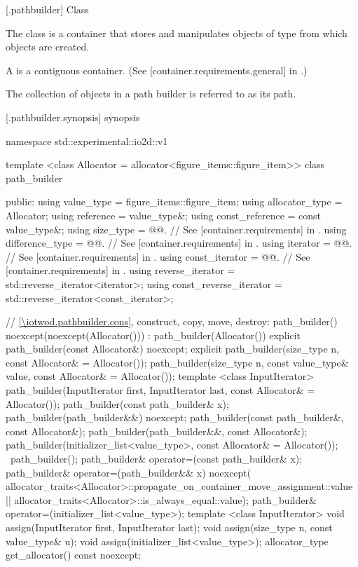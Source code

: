  [\iotwod.pathbuilder] {Class }

\pnum
{}%
The class  is a container that stores and manipulates objects of type  from which  objects are created.

\pnum
A  is a contiguous container. (See [container.requirements.general] in \cppseventeen.)

\pnum
The collection of  objects in a path builder is referred to as its path.

 [\iotwod.pathbuilder.synopsis] { synopsis}%

\begin{codeblock}
namespace std::experimental::io2d::v1 {
  template <class Allocator = allocator<figure_items::figure_item>>
  class path_builder {
  public:
    using value_type = figure_items::figure_item;
    using allocator_type = Allocator;
    using reference = value_type&;
    using const_reference = const value_type&;
    using size_type       = @@. // See [container.requirements] in \cppseventeen.
    using difference_type = @@. // See [container.requirements] in \cppseventeen.
    using iterator       = @@. // See [container.requirements] in \cppseventeen.
    using const_iterator = @@. // See [container.requirements] in \cppseventeen.
    using reverse_iterator       = std::reverse_iterator<iterator>;
    using const_reverse_iterator = std::reverse_iterator<const_iterator>;
    
    // \ref{\iotwod.pathbuilder.cons}, construct, copy, move, destroy:
    path_builder() noexcept(noexcept(Allocator())) :
      path_builder(Allocator()) { }
    explicit path_builder(const Allocator&) noexcept;
    explicit path_builder(size_type n, const Allocator& = Allocator());
    path_builder(size_type n, const value_type& value,
      const Allocator& = Allocator());
    template <class InputIterator>
    path_builder(InputIterator first, InputIterator last,
      const Allocator& = Allocator());
    path_builder(const path_builder& x);
    path_builder(path_builder&&) noexcept;
    path_builder(const path_builder&, const Allocator&);
    path_builder(path_builder&&, const Allocator&);
    path_builder(initializer_list<value_type>, const Allocator& = Allocator());
    ~path_builder();
    path_builder& operator=(const path_builder& x);
    path_builder& operator=(path_builder&& x)
      noexcept(
      allocator_traits<Allocator>::propagate_on_container_move_assignment::value
      ||
      allocator_traits<Allocator>::is_always_equal::value);
    path_builder& operator=(initializer_list<value_type>);
    template <class InputIterator>
    void assign(InputIterator first, InputIterator last);
    void assign(size_type n, const value_type& u);
    void assign(initializer_list<value_type>);
    allocator_type get_allocator() const noexcept;
    
}}
\end{codeblock}
